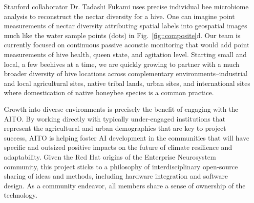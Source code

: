 Stanford collaborator Dr. Tadashi Fukami uses precise individual bee microbiome analysis \cite{Fukami2022} to reconstruct the nectar diversity for a hive. 
One can imagine point measurements of nectar diversity attributing spatial labels into geospatial images much like the water sample points (dots) in Fig.~\ref{fig::composite}d.
Our team is currently focused on continuous passive acoustic monitoring that would add point measurements of hive health, queen state, and agitation level. 
Starting small and local, a few beehives at a time, we are quickly growing to partner with a much broader diversity of hive locations across complementary environments--industrial and local agricultural sites, native tribal lands, urban sites, and international sites where domestication of native honeybee species is a common practice.

Growth into diverse environments is precisely the benefit of engaging with the AITO.
By working directly with typically under-engaged institutions that represent the agricultural and urban demographics that are key to project success, AITO is helping foster AI development in the communities that will have specific and outsized positive impacts on the future of climate resilience and adaptability.
Given the Red Hat origins of the Enterprise Neurosystem community, this project sticks to a philosophy of interdisciplinary open-source sharing of ideas and methods, including hardware integration and software design. 
As a community endeavor, all members share a sense of ownership of the technology.

